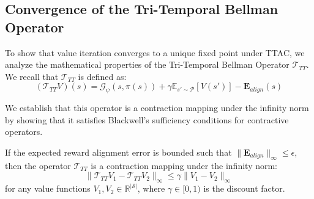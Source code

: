 \documentclass[manuscript, screen, review]{jair}
\begin{document}
\subsection{Convergence of the Tri-Temporal Bellman Operator}
To show that value iteration converges to a unique fixed point under TTAC, we analyze the mathematical properties of the Tri-Temporal Bellman Operator $\mathcal{T}_{TT}$. We recall that $\mathcal{T}_{TT}$ is defined as:
\begin{equation}
    \left( \mathcal{T}_{TT} V \right)(s) = \mathcal{G}_\psi(s, \pi(s)) + \gamma \mathbb{E}_{s' \sim \mathcal{P}} \left[ V(s') \right] - \mathbf{E}_{align}(s)
\end{equation}

We establish that this operator is a contraction mapping under the infinity norm by showing that it satisfies Blackwell's sufficiency conditions for contractive operators.

\begin{lemma}\label{lem:contraction}
If the expected reward alignment error is bounded such that $\|\mathbf{E}_{align}\|_\infty \le \epsilon$, then the operator $\mathcal{T}_{TT}$ is a contraction mapping under the infinity norm:
\begin{equation}
    \| \mathcal{T}_{TT} V_1 - \mathcal{T}_{TT} V_2 \|_\infty \le \gamma \| V_1 - V_2 \|_\infty
\end{equation}
for any value functions $V_1, V_2 \in \mathbb{R}^{|\mathcal{S}|}$, where $\gamma \in [0, 1)$ is the discount factor.
\end{lemma}
\end{document}
